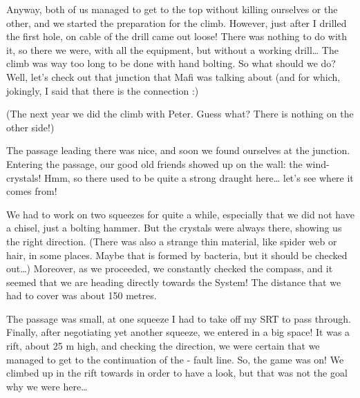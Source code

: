 Anyway, both of us managed to get to the top without killing ourselves
or the other, and we started the preparation for the climb. However,
just after I drilled the first hole, on cable of the drill came out
loose! There was nothing to do with it, so there we were, with all the
equipment, but without a working drill\ldots{} The climb was way too
long to be done with hand bolting. So what should we do? Well, let's
check out that junction that Mafi was talking about (and for which,
jokingly, I said that there is the connection :)

(The next year we did
the climb with Peter. Guess what? There is nothing on the other side!)

The passage leading there was nice, and soon we found ourselves at the
junction. Entering the passage, our good old friends showed up on the
wall: the wind-crystals! Hmm, so there used to be quite a strong draught
here\ldots{} let's see where it comes from!

We had to work on two squeezes for quite a while, especially that we did
not have a chisel, just a bolting hammer. But the crystals were always
there, showing us the right direction. (There was also a strange thin
material, like spider web or hair, in some places. Maybe that is formed
by bacteria, but it should be checked out\ldots{}) Moreover, as we
proceeded, we constantly checked the compass, and it seemed that we are
heading directly towards the System! The distance that we had to cover
was about 150 metres.

The passage was small, at one squeeze I had to take off my SRT to pass
through. Finally, after negotiating yet another squeeze, we entered in a
big space! It was a rift, about 25 m high, and checking the direction,
we were certain that we managed to get to the continuation of the
- fault line. So, the game was on!
We climbed up in the rift towards  in order to have a
look, but that was not the goal why we were here\ldots{}


